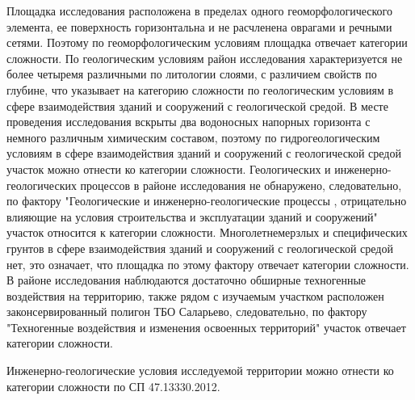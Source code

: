 Площадка исследования 
расположена в пределах одного геоморфологического элемента, ее поверхность 
горизонтальна и не расчленена оврагами и речными сетями. Поэтому по 
геоморфологическим условиям площадка отвечает  
категории сложности. По геологическим условиям район исследования 
характеризуется не более четыремя различными по литологии слоями, 
с различием свойств по глубине, что указывает на  
категорию сложности по геологическим условиям в сфере взаимодействия 
зданий и сооружений с геологической средой. В месте проведения 
исследования вскрыты два водоносных напорных горизонта с немного 
различным химическим составом, поэтому по гидрогеологическим 
условиям  в сфере взаимодействия зданий и сооружений с геологической 
средой участок можно отнести ко  категории 
сложности. Геологических и инженерно-геологических процессов 
в районе исследования не обнаружено, следовательно, по фактору 
"Геологические и инженерно-геологические процессы
, отрицательно влияющие на условия строительства и эксплуатации 
зданий и сооружений" участок относится к  
категории сложности. Многолетнемерзлых и специфических грунтов 
в сфере взаимодействия зданий и сооружений с геологической средой
нет, это означает, что площадка по этому фактору отвечает 
 категории сложности. В районе исследования 
наблюдаются достаточно обширные техногенные воздействия на территорию, 
также рядом с изучаемым участком расположен законсервированный 
полигон ТБО Саларьево, следовательно, по фактору 
"Техногенные воздействия и изменения освоенных территорий" участок 
отвечает  категории сложности.

Инженерно-геологические условия исследуемой территории можно отнести ко 
 категории сложности по СП 47.13330.2012.